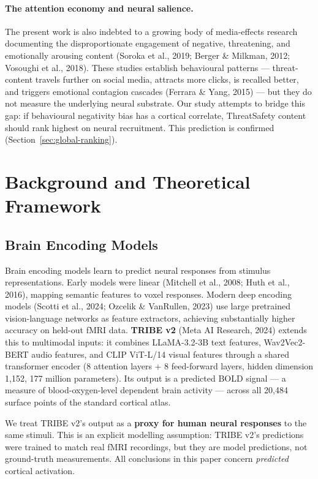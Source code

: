 \documentclass[11pt,letterpaper]{article}
\begin{document}
\paragraph{The attention economy and neural salience.} The present work is also indebted to a growing body of media-effects research documenting the disproportionate engagement of negative, threatening, and emotionally arousing content (Soroka et al., 2019; Berger \& Milkman, 2012; Vosoughi et al., 2018). These studies establish behavioural patterns --- threat-content travels further on social media, attracts more clicks, is recalled better, and triggers emotional contagion cascades (Ferrara \& Yang, 2015) --- but they do not measure the underlying neural substrate. Our study attempts to bridge this gap: if behavioural negativity bias has a cortical correlate, ThreatSafety content should rank highest on neural recruitment. This prediction is confirmed (Section~\ref{sec:global-ranking}).

\section{Background and Theoretical Framework}

\subsection{Brain Encoding Models}

Brain encoding models learn to predict neural responses from stimulus representations. Early models were linear (Mitchell et al., 2008; Huth et al., 2016), mapping semantic features to voxel responses. Modern deep encoding models (Scotti et al., 2024; Ozcelik \& VanRullen, 2023) use large pretrained vision-language networks as feature extractors, achieving substantially higher accuracy on held-out fMRI data. \textbf{TRIBE v2} (Meta AI Research, 2024) extends this to multimodal inputs: it combines LLaMA-3.2-3B text features, Wav2Vec2-BERT audio features, and CLIP ViT-L/14 visual features through a shared transformer encoder (8 attention layers + 8 feed-forward layers, hidden dimension 1{,}152, 177 million parameters). Its output is a predicted BOLD signal --- a measure of blood-oxygen-level dependent brain activity --- across all 20{,}484 surface points of the standard cortical atlas.

We treat TRIBE v2's output as a \textbf{proxy for human neural responses} to the same stimuli. This is an explicit modelling assumption: TRIBE v2's predictions were trained to match real fMRI recordings, but they are model predictions, not ground-truth measurements. All conclusions in this paper concern \textit{predicted} cortical activation.
\end{document}

